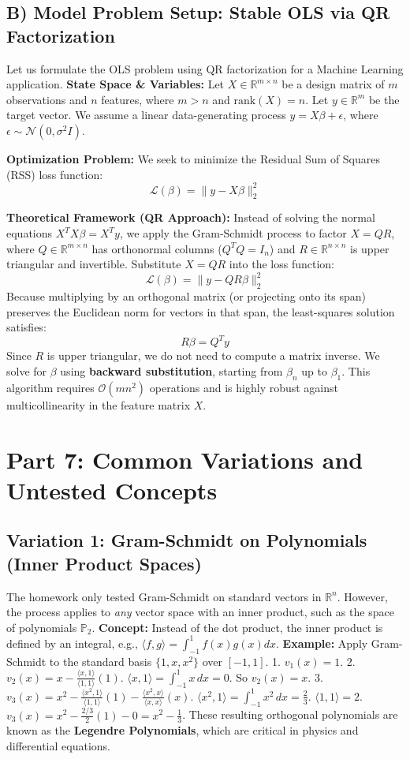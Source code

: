 \documentclass[11pt, letterpaper]{article}
\theoremstyle{definition}
\theoremstyle{remark}
\newcommand{\R}{\mathbb{R}}
\begin{document}
\subsection{B) Model Problem Setup: Stable OLS via QR Factorization}
Let us formulate the OLS problem using QR factorization for a Machine Learning application.
\textbf{State Space \& Variables:}
Let $X \in \R^{m \times n}$ be a design matrix of $m$ observations and $n$ features, where $m > n$ and $\text{rank}(X) = n$. Let $y \in \R^m$ be the target vector. We assume a linear data-generating process $y = X\beta + \epsilon$, where $\epsilon \sim \mathcal{N}(0, \sigma^2 I)$.

\textbf{Optimization Problem:}
We seek to minimize the Residual Sum of Squares (RSS) loss function:
\[ \mathcal{L}(\beta) = \| y - X\beta \|_2^2 \]

\textbf{Theoretical Framework (QR Approach):}
Instead of solving the normal equations $X^T X \beta = X^T y$, we apply the Gram-Schmidt process to factor $X = QR$, where $Q \in \R^{m \times n}$ has orthonormal columns ($Q^T Q = I_n$) and $R \in \R^{n \times n}$ is upper triangular and invertible.
Substitute $X = QR$ into the loss function:
\[ \mathcal{L}(\beta) = \| y - QR\beta \|_2^2 \]
Because multiplying by an orthogonal matrix (or projecting onto its span) preserves the Euclidean norm for vectors in that span, the least-squares solution satisfies:
\[ R\beta = Q^T y \]
Since $R$ is upper triangular, we do not need to compute a matrix inverse. We solve for $\beta$ using \textbf{backward substitution}, starting from $\beta_n$ up to $\beta_1$. This algorithm requires $\mathcal{O}(mn^2)$ operations and is highly robust against multicollinearity in the feature matrix $X$.

\newpage
\section{Part 7: Common Variations and Untested Concepts}

\subsection{Variation 1: Gram-Schmidt on Polynomials (Inner Product Spaces)}
The homework only tested Gram-Schmidt on standard vectors in $\R^n$. However, the process applies to \textit{any} vector space with an inner product, such as the space of polynomials $\mathbb{P}_2$.
\textbf{Concept:} Instead of the dot product, the inner product is defined by an integral, e.g., $\langle f, g \rangle = \int_{-1}^1 f(x)g(x) dx$.
\textbf{Example:} Apply Gram-Schmidt to the standard basis $\{1, x, x^2\}$ over $[-1, 1]$.
1. $v_1(x) = 1$.
2. $v_2(x) = x - \frac{\langle x, 1 \rangle}{\langle 1, 1 \rangle}(1)$. 
   $\langle x, 1 \rangle = \int_{-1}^1 x \, dx = 0$. So $v_2(x) = x$.
3. $v_3(x) = x^2 - \frac{\langle x^2, 1 \rangle}{\langle 1, 1 \rangle}(1) - \frac{\langle x^2, x \rangle}{\langle x, x \rangle}(x)$.
   $\langle x^2, 1 \rangle = \int_{-1}^1 x^2 \, dx = \frac{2}{3}$. $\langle 1, 1 \rangle = 2$.
   $v_3(x) = x^2 - \frac{2/3}{2}(1) - 0 = x^2 - \frac{1}{3}$.
These resulting orthogonal polynomials are known as the \textbf{Legendre Polynomials}, which are critical in physics and differential equations.
\end{document}
